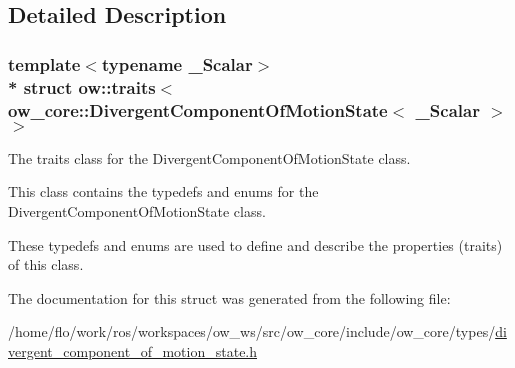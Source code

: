 \subsection{Detailed Description}
\subsubsection*{template$<$typename \+\_\+\+Scalar$>$\\*
struct ow\+::traits$<$ ow\+\_\+core\+::\+Divergent\+Component\+Of\+Motion\+State$<$ \+\_\+\+Scalar $>$ $>$}

The traits class for the Divergent\+Component\+Of\+Motion\+State class. 

This class contains the typedefs and enums for the Divergent\+Component\+Of\+Motion\+State class.

These typedefs and enums are used to define and describe the properties (traits) of this class. 

The documentation for this struct was generated from the following file\+:\begin{DoxyCompactItemize}
\item 
/home/flo/work/ros/workspaces/ow\+\_\+ws/src/ow\+\_\+core/include/ow\+\_\+core/types/\hyperlink{divergent__component__of__motion__state_8h}{divergent\+\_\+component\+\_\+of\+\_\+motion\+\_\+state.\+h}\end{DoxyCompactItemize}
